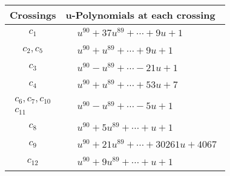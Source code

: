 \documentclass[1p]{elsarticle_modified}
\theoremstyle{definition}
\begin{document}
\begin{tabular}{m{50pt}|m{274pt}}
Crossings & \hspace{64pt}u-Polynomials at each crossing \\
\hline $$\begin{aligned}c_{1}\end{aligned}$$&$\begin{aligned}
&u^{90}+37 u^{89}+\cdots+9 u+1
\end{aligned}$\\
\hline $$\begin{aligned}c_{2},c_{5}\end{aligned}$$&$\begin{aligned}
&u^{90}+u^{89}+\cdots+9 u+1
\end{aligned}$\\
\hline $$\begin{aligned}c_{3}\end{aligned}$$&$\begin{aligned}
&u^{90}- u^{89}+\cdots-21 u+1
\end{aligned}$\\
\hline $$\begin{aligned}c_{4}\end{aligned}$$&$\begin{aligned}
&u^{90}+u^{89}+\cdots+53 u+7
\end{aligned}$\\
\hline $$\begin{aligned}c_{6},c_{7},c_{10}\\c_{11}\end{aligned}$$&$\begin{aligned}
&u^{90}- u^{89}+\cdots-5 u+1
\end{aligned}$\\
\hline $$\begin{aligned}c_{8}\end{aligned}$$&$\begin{aligned}
&u^{90}+5 u^{89}+\cdots+u+1
\end{aligned}$\\
\hline $$\begin{aligned}c_{9}\end{aligned}$$&$\begin{aligned}
&u^{90}+21 u^{89}+\cdots+30261 u+4067
\end{aligned}$\\
\hline $$\begin{aligned}c_{12}\end{aligned}$$&$\begin{aligned}
&u^{90}+9 u^{89}+\cdots+u+1
\end{aligned}$\\
\hline
\end{tabular}\newpage\renewcommand{\arraystretch}{1}
\end{document}
